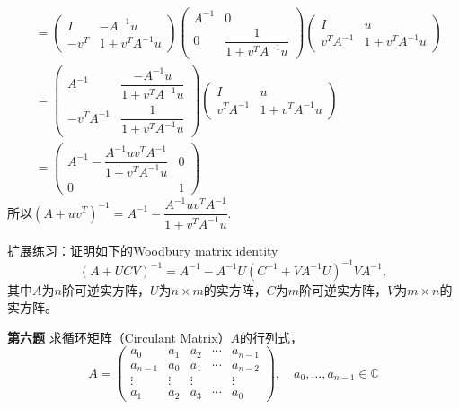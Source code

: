 \begin{align*}
& = \begin{pmatrix} I & -A^{-1}u \\ -v^T & 1 + v^TA^{-1}u \end{pmatrix} \begin{pmatrix} A^{-1} & 0 \\ 0 & \dfrac{1}{1 + v^TA^{-1}u} \end{pmatrix} \begin{pmatrix} I & u \\ v^TA^{-1} & 1 + v^TA^{-1}u \end{pmatrix} \\
& = \begin{pmatrix} A^{-1} & \dfrac{-A^{-1}u}{1 + v^TA^{-1}u} \\ -v^T A^{-1} & \dfrac{1}{1 + v^TA^{-1}u} \end{pmatrix} \begin{pmatrix} I & u \\ v^TA^{-1} & 1 + v^TA^{-1}u \end{pmatrix} \\
& = \begin{pmatrix} A^{-1} - \dfrac{ A^{-1}uv^TA^{-1}}{1 + v^TA^{-1}u} & 0 \\ 0 & 1 \end{pmatrix}
\end{align*}
所以$(A + uv^T)^{-1} = A^{-1} - \dfrac{ A^{-1}uv^TA^{-1}}{1 + v^TA^{-1}u}.$

\vspace{2em}

扩展练习：证明如下的Woodbury matrix identity
$$\left( A + UCV \right)^{-1} = A^{-1} - A^{-1} U \left( C^{-1} + VA^{-1}U \right)^{-1} V A^{-1},$$
其中$A$为$n$阶可逆实方阵，$U$为$n\times m$的实方阵，$C$为$m$阶可逆实方阵，$V$为$m\times n$的实方阵。

\fi  %

\newpageorvspace

{\bf 第六题} 求循环矩阵（Circulant Matrix）$A$的行列式，
$$A = \begin{pmatrix} a_0 & a_1 & a_2 & \cdots & a_{n-1} \\ a_{n-1} & a_0 & a_1 & \cdots & a_{n-2} \\ \vdots & \vdots & \vdots & & \vdots \\ a_1 & a_2 & a_3 & \cdots & a_0 \end{pmatrix}, \quad a_0,\ldots,a_{n-1} \in \mathbb{C}$$

\ifIncludeAnswer

\newpageorvspace

